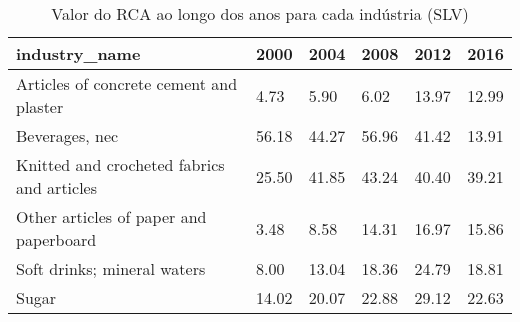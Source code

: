 \begin{table}
\centering
\caption{Valor do RCA ao longo dos anos para cada indústria (SLV)}
\begin{tabular}{p{6cm}p{1.5cm}p{1.5cm}p{1.5cm}p{1.5cm}p{1.5cm}}
\toprule
                             industry\_name &  2000 &  2004 &  2008 &  2012 &  2016 \\
\midrule
   Articles of concrete cement and plaster &  4.73 &  5.90 &  6.02 & 13.97 & 12.99 \\
                            Beverages, nec & 56.18 & 44.27 & 56.96 & 41.42 & 13.91 \\
Knitted and crocheted fabrics and articles & 25.50 & 41.85 & 43.24 & 40.40 & 39.21 \\
    Other articles of paper and paperboard &  3.48 &  8.58 & 14.31 & 16.97 & 15.86 \\
               Soft drinks; mineral waters &  8.00 & 13.04 & 18.36 & 24.79 & 18.81 \\
                                     Sugar & 14.02 & 20.07 & 22.88 & 29.12 & 22.63 \\
\bottomrule
\end{tabular}
\end{table}
